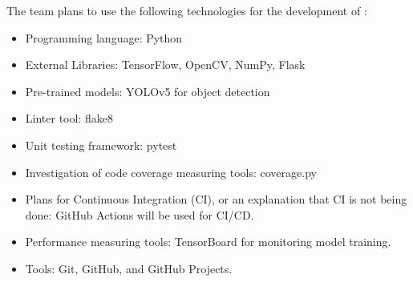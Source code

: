 \documentclass{article}
\begin{document}




The team plans to use the following technologies for the development of \progname{}:
\begin{itemize}
\item Programming language: Python
\item External Libraries: TensorFlow, OpenCV, NumPy, Flask
\item Pre-trained models: YOLOv5 for object detection
\item Linter tool: flake8
\item Unit testing framework: pytest
\item Investigation of code coverage measuring tools: coverage.py
\item Plans for Continuous Integration (CI), or an explanation that CI
  is not being done: GitHub Actions will be used for CI/CD.
\item Performance measuring tools: TensorBoard for monitoring model training.
\item Tools: Git, GitHub, and GitHub Projects.
\end{itemize}
\end{document}

